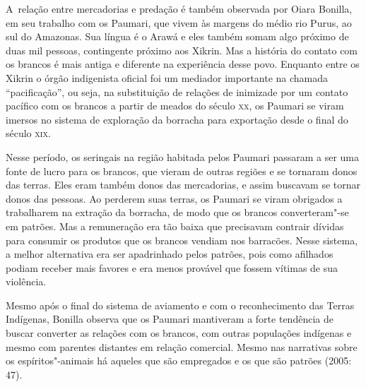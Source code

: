 A~relação entre mercadorias e predação é também observada por Oiara
Bonilla, em seu trabalho com os Paumari, que vivem às margens do médio
rio Purus, ao sul do Amazonas. Sua língua é o Arawá e eles também somam
algo próximo de duas mil pessoas, contingente próximo aos Xikrin. Mas a
história do contato com os brancos é mais antiga e diferente na
experiência desse povo. Enquanto entre os Xikrin o órgão indigenista
oficial foi um mediador importante na chamada ``pacificação'', ou seja,
na substituição de relações de inimizade por um contato pacífico com os
brancos a partir de meados do século \textsc{xx}, os Paumari se viram imersos no
sistema de exploração da borracha para exportação desde o final do
século \textsc{xix}.

Nesse período, os seringais na região habitada pelos Paumari passaram a
ser uma fonte de lucro para os brancos, que vieram de outras regiões e
se tornaram donos das terras. Eles eram também donos das mercadorias, e
assim buscavam se tornar donos das pessoas. Ao perderem suas terras, os
Paumari se viram obrigados a trabalharem na extração da borracha, de
modo que os brancos converteram"-se em patrões. Mas a remuneração era
tão baixa que precisavam contrair dívidas para consumir os produtos que
os brancos vendiam nos barracões. Nesse sistema, a melhor alternativa
era ser apadrinhado pelos patrões, pois como afilhados podiam receber
mais favores e era menos provável que fossem vítimas de sua violência.

Mesmo após o final do sistema de aviamento e com o reconhecimento das
Terras Indígenas, Bonilla observa que os Paumari mantiveram a forte
tendência de buscar converter as relações com os brancos, com outras
populações indígenas e mesmo com parentes distantes em relação
comercial. Mesmo nas narrativas sobre os espíritos"-animais há aqueles
que são empregados e os que são patrões (2005: 47).

